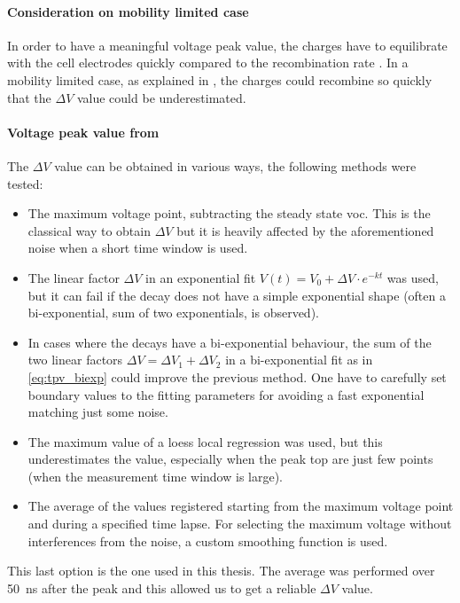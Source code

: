 \paragraph{Consideration on mobility limited case}
	In order to have a meaningful voltage peak value, the charges have to equilibrate with the cell electrodes quickly compared to the recombination rate \cite{Credgington2014}.
	In a mobility limited case, as explained in , the charges could recombine so quickly that the $\Delta V$ value could be underestimated.

	\paragraph{Voltage peak value from }\label{tpv_deltaV}
	The $\Delta V$ value can be obtained in various ways, the following methods were tested:
	\begin{itemize}
		\item The maximum voltage point, subtracting the steady state \gls{voc}. This is the classical way to obtain $\Delta V$ but it is heavily affected by the aforementioned noise when a short time window is used.
		\item The linear factor $\Delta V$ in an exponential fit $V (t) = V_0 + \Delta V \cdot e^{-kt}$ was used, but it can fail if the decay does not have a simple exponential shape (often a bi-exponential, sum of two exponentials, is observed).
		\item In cases where the  decays have a bi-exponential behaviour, the sum of the two linear factors $\Delta V = \Delta V_1 + \Delta V_2$ in a bi-exponential fit as in \cref{eq:tpv_biexp} could improve the previous method. One have to carefully set boundary values to the fitting parameters for avoiding a fast exponential matching just some noise.
		\item The maximum value of a \gls{loess} local regression was used, but this underestimates the value, especially when the peak top are just few points (when the measurement time window is large).
		\item The average of the values registered starting from the maximum voltage point and during a specified time lapse. For selecting the maximum voltage without interferences from the noise, a custom smoothing function is used.
	\end{itemize}
	This last option is the one used in this thesis. 
	The average was performed over \SI{50}{\nano\s} after the peak and this allowed us to get a reliable $\Delta V$ value.
